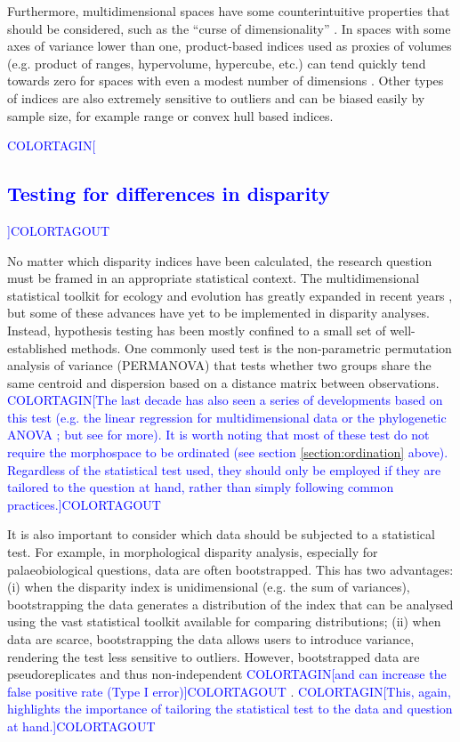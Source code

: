 \documentclass[12pt,letterpaper]{article}
\begin{document}
Furthermore, multidimensional spaces have some counterintuitive properties that should be considered, such as the ``curse of dimensionality'' \citep{Bellman1966}.
In spaces with some axes of variance lower than one, product-based indices used as proxies of volumes (e.g. product of ranges, hypervolume, hypercube, etc.) can tend quickly tend towards zero for spaces with even a modest number of dimensions \citep{Bellman1966}.
Other types of indices are also extremely sensitive to outliers and can be biased easily by sample size, for example range \citep{Wills2001} or convex hull based \citep{Jackson2011} indices.

\textcolor{blue}{COLORTAGIN[\subsection{Testing for differences in disparity} ]COLORTAGOUT\label{section:testing}}

No matter which disparity indices have been calculated, the research question must be framed in an appropriate statistical context.
The multidimensional statistical toolkit for ecology and evolution has greatly expanded in recent years \citep{clavel2015mvmorph, Adams2018}, but some of these advances have yet to be implemented in disparity analyses.
Instead, hypothesis testing has been mostly confined to a small set of well-established methods.
One commonly used test is the non-parametric permutation analysis of variance (PERMANOVA) \citep{Anderson2001} that tests whether two groups share the same centroid and dispersion based on a distance matrix between observations.
\textcolor{blue}{COLORTAGIN[The last decade has also seen a series of developments based on this test (e.g. the linear regression for multidimensional data \citealt{collyer2015method} or the phylogenetic ANOVA \citealt{Adams2014}; but see \citealt{Adams2018,lloyd2016} for more).
It is worth noting that most of these test do not require the morphospace to be ordinated (see section \ref{section:ordination} above).
Regardless of the statistical test used, they should only be employed if they are tailored to the question at hand, rather than simply following common practices.]COLORTAGOUT}

It is also important to consider which data should be subjected to a statistical test.
For example, in morphological disparity analysis, especially for palaeobiological questions, data are often bootstrapped.
This has two advantages: (i) when the disparity index is unidimensional (e.g. the sum of variances), bootstrapping the data generates a distribution of the index that can be analysed using the vast statistical toolkit available for comparing distributions; (ii) when data are scarce, bootstrapping the data allows users to introduce variance, rendering the test less sensitive to outliers.
However, bootstrapped data are pseudoreplicates and thus non-independent \textcolor{blue}{COLORTAGIN[and can increase the false positive rate (Type I error)]COLORTAGOUT} \citep{strube1988bootstrap}.
\textcolor{blue}{COLORTAGIN[This, again, highlights the importance of tailoring the statistical test to the data and question at hand.]COLORTAGOUT}
\end{document}

